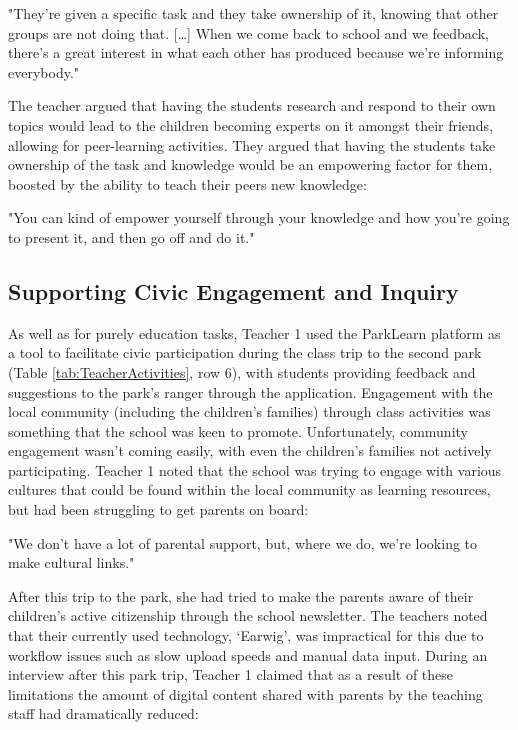\begin{displayquote}
"They’re given a specific task and they take ownership of it, knowing that other groups are not doing that. […] When we come back to school and we feedback, there’s a great interest in what each other has produced because we’re informing everybody."
\end{displayquote}

The teacher argued that having the students research and respond to their own topics would lead to the children becoming experts on it amongst their friends, allowing for peer-learning activities. They argued that having the students take ownership of the task and knowledge would be an empowering factor for them, boosted by the ability to teach their peers new knowledge:

\begin{displayquote}
"You can kind of empower yourself through your knowledge and how you’re going to present it, and then go off and do it."
\end{displayquote}


\subsection{Supporting Civic Engagement and Inquiry}

As well as for purely education tasks, Teacher 1 used the ParkLearn platform as a tool to facilitate civic participation during the class trip to the second park (Table \ref{tab:TeacherActivities}, row 6), with students providing feedback and suggestions to the park's ranger through the application. Engagement with the local community (including the children's families) through class activities was something that the school was keen to promote. Unfortunately, community engagement wasn't coming easily, with even the children's families not actively participating. Teacher 1 noted that the school was trying to engage with various cultures that could be found within the local community as learning resources, but had been struggling to get parents on board: 

\begin{displayquote}
"We don’t have a lot of parental support, but, where we do, we’re looking to make cultural links."
\end{displayquote}

After this trip to the park, she had tried to make the parents aware of their children’s active citizenship through the school newsletter. The teachers noted that their currently used technology, `Earwig', was impractical for this due to workflow issues such as slow upload speeds and manual data input. During an interview after this park trip, Teacher 1 claimed that as a result of these limitations the amount of digital content shared with parents by the teaching staff had dramatically reduced:

